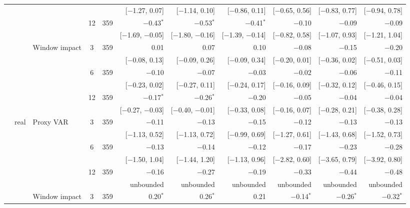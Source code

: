 \begin{longtable}{lllcrrrrrrr}
 & & & & & {\tiny [$-$1.27, 0.07]} & {\tiny [$-$1.14, 0.10]} & {\tiny [$-$0.86, 0.11]} & {\tiny [$-$0.65, 0.56]} & {\tiny [$-$0.83, 0.77]} & {\tiny [$-$0.94, 0.78]}\\
 &  &  & 12 & 359 & $-$0.43$^{*}$ & $-$0.53$^{*}$ & $-$0.41$^{*}$ & $-$0.10 & $-$0.09 & $-$0.09\\
 & & & & & {\tiny [$-$1.69, $-$0.05]} & {\tiny [$-$1.80, $-$0.16]} & {\tiny [$-$1.39, $-$0.14]} & {\tiny [$-$0.82, 0.58]} & {\tiny [$-$1.07, 0.93]} & {\tiny [$-$1.21, 1.04]}\\
 &  & Window impact & 3 & 359 & 0.01 & 0.07 & 0.10 & $-$0.08 & $-$0.15 & $-$0.20\\
 & & & & & {\tiny [$-$0.08, 0.13]} & {\tiny [$-$0.09, 0.26]} & {\tiny [$-$0.09, 0.34]} & {\tiny [$-$0.20, 0.01]} & {\tiny [$-$0.36, 0.02]} & {\tiny [$-$0.51, 0.03]}\\
 &  &  & 6 & 359 & $-$0.10 & $-$0.07 & $-$0.03 & $-$0.02 & $-$0.06 & $-$0.11\\
 & & & & & {\tiny [$-$0.23, 0.02]} & {\tiny [$-$0.27, 0.11]} & {\tiny [$-$0.24, 0.17]} & {\tiny [$-$0.16, 0.09]} & {\tiny [$-$0.32, 0.12]} & {\tiny [$-$0.46, 0.15]}\\
 &  &  & 12 & 359 & $-$0.17$^{*}$ & $-$0.26$^{*}$ & $-$0.20 & $-$0.05 & $-$0.04 & $-$0.04\\
 & & & & & {\tiny [$-$0.27, $-$0.03]} & {\tiny [$-$0.40, $-$0.01]} & {\tiny [$-$0.33, 0.08]} & {\tiny [$-$0.16, 0.07]} & {\tiny [$-$0.28, 0.21]} & {\tiny [$-$0.38, 0.28]}\\
 & real & Proxy VAR & 3 & 359 & $-$0.11 & $-$0.13 & $-$0.15 & $-$0.12 & $-$0.13 & $-$0.13\\
 & & & & & {\tiny [$-$1.13, 0.52]} & {\tiny [$-$1.13, 0.72]} & {\tiny [$-$0.99, 0.69]} & {\tiny [$-$1.27, 0.61]} & {\tiny [$-$1.43, 0.68]} & {\tiny [$-$1.52, 0.73]}\\
 &  &  & 6 & 359 & $-$0.13 & $-$0.14 & $-$0.12 & $-$0.17 & $-$0.23 & $-$0.28\\
 & & & & & {\tiny [$-$1.50, 1.04]} & {\tiny [$-$1.44, 1.20]} & {\tiny [$-$1.13, 0.96]} & {\tiny [$-$2.82, 0.60]} & {\tiny [$-$3.65, 0.79]} & {\tiny [$-$3.92, 0.80]}\\
 &  &  & 12 & 359 & $-$0.16 & $-$0.27 & $-$0.19 & $-$0.33 & $-$0.44 & $-$0.48\\
 & & & & & {\tiny unbounded} & {\tiny unbounded} & {\tiny unbounded} & {\tiny unbounded} & {\tiny unbounded} & {\tiny unbounded}\\
 &  & Window impact & 3 & 359 & 0.20$^{*}$ & 0.26$^{*}$ & 0.21 & $-$0.14$^{*}$ & $-$0.26$^{*}$ & $-$0.32$^{*}$\\

\end{longtable}
